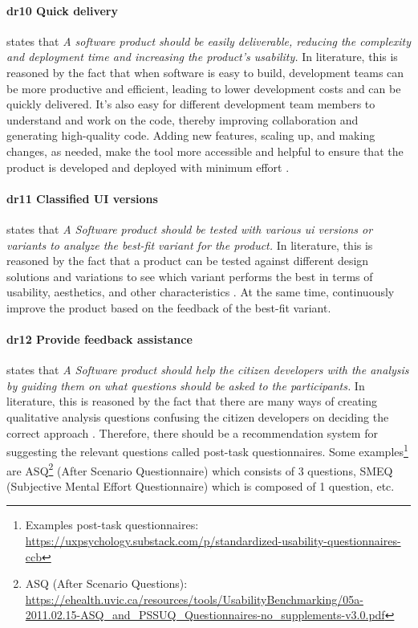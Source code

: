 \paragraph{\ac{dr}10 Quick delivery} states that \textit{A software product should be easily deliverable, reducing the complexity and deployment time and increasing the product's usability.} 
In literature, this is reasoned by the fact that when software is easy to build, development teams can be more productive and efficient, leading to lower development costs \cite{misc:lowcode:platforms} and can be quickly delivered. 
It's also easy for different development team members to understand and work on the code, thereby improving collaboration \cite{misc:prorotypes:lauff} and generating high-quality code.
Adding new features, scaling up, and making changes, as needed, make the tool more accessible and helpful \cite{article:prototyping:lowcode} to ensure that the product is developed and deployed with minimum effort \cite{article:prototyping:lowcode}.

\paragraph*{\ac{dr}11 Classified UI versions} states that \textit{A Software product should be tested with various \ac{ui} versions or variants to analyze the best-fit variant for the product.}
In literature, this is reasoned by the fact that a product can be tested against different design solutions and variations \cite{article:CE:fitzgerald} to see which variant performs the best in terms of usability, aesthetics, and other characteristics \cite{article:controlled:experiements}. 
At the same time, continuously improve \cite{article:CE:ros} the product based on the feedback of the best-fit variant.

\paragraph*{\ac{dr}12 Provide feedback assistance} states that \textit{A Software product should help the citizen developers with the analysis by guiding them on what questions should be asked to the participants.}
In literature, this is reasoned by the fact that there are many ways of creating qualitative analysis questions \cite{misc:dsr:mayring} confusing the citizen developers on deciding the correct approach \cite{misc:qualitative:qualitative}.
Therefore, there should be a recommendation system for suggesting the relevant questions called post-task questionnaires.
Some examples\footnote{Examples post-task questionnaires: \url{https://uxpsychology.substack.com/p/standardized-usability-questionnaires-ccb}} are ASQ\footnote{ASQ (After Scenario Questions): \url{https://ehealth.uvic.ca/resources/tools/UsabilityBenchmarking/05a-2011.02.15-ASQ_and_PSSUQ_Questionnaires-no_supplements-v3.0.pdf}} (After Scenario Questionnaire) which consists of 3 questions, SMEQ (Subjective Mental Effort Questionnaire) which is composed of 1 question, etc. 

